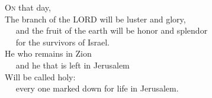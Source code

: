 
\lettrine{O}{n} that day,\\
The branch of the LORD will be luster and glory,\\
   and the fruit of the earth will be honor and splendor\\
   for the survivors of Israel.\\
He who remains in Zion\\
   and he that is left in Jerusalem\\
Will be called holy:\\
   every one marked down for life in Jerusalem.
